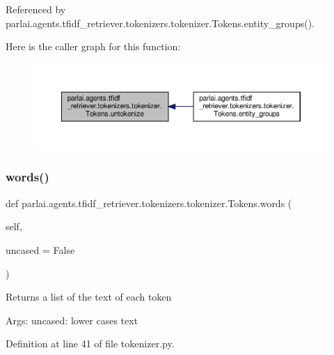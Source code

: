 Referenced by parlai.\+agents.\+tfidf\+\_\+retriever.\+tokenizers.\+tokenizer.\+Tokens.\+entity\+\_\+groups().

Here is the caller graph for this function\+:
\nopagebreak
\begin{figure}[H]
\begin{center}
\leavevmode
\includegraphics[width=350pt]{classparlai_1_1agents_1_1tfidf__retriever_1_1tokenizers_1_1tokenizer_1_1Tokens_a1bea40b1ea8e1772fb8ae6c2157ee819_icgraph}
\end{center}
\end{figure}
\mbox{\label{classparlai_1_1agents_1_1tfidf__retriever_1_1tokenizers_1_1tokenizer_1_1Tokens_a81b6d47a051c87c7f885a6f7db5ac891}} 
\subsubsection{\texorpdfstring{words()}{words()}}
{\footnotesize\ttfamily def parlai.\+agents.\+tfidf\+\_\+retriever.\+tokenizers.\+tokenizer.\+Tokens.\+words (\begin{DoxyParamCaption}\item[{}]{self,  }\item[{}]{uncased = {\ttfamily False} }\end{DoxyParamCaption})}

\begin{DoxyVerb}Returns a list of the text of each token

Args:
    uncased: lower cases text
\end{DoxyVerb}
 

Definition at line 41 of file tokenizer.\+py.



